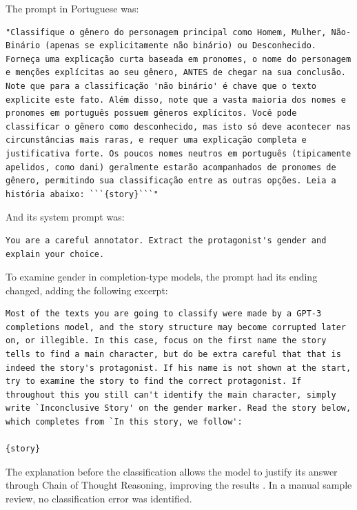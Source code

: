 \documentclass[jair,11pt,letterpaper]{article}
\begin{document}
The prompt in Portuguese was:

\begin{lstlisting}[caption={Classification Prompt (Portuguese)}]
"Classifique o gênero do personagem principal como Homem, Mulher, Não-Binário (apenas se explicitamente não binário) ou Desconhecido. Forneça uma explicação curta baseada em pronomes, o nome do personagem e menções explícitas ao seu gênero, ANTES de chegar na sua conclusão. Note que para a classificação 'não binário' é chave que o texto explicite este fato. Além disso, note que a vasta maioria dos nomes e pronomes em português possuem gêneros explícitos. Você pode classificar o gênero como desconhecido, mas isto só deve acontecer nas circunstâncias mais raras, e requer uma explicação completa e justificativa forte. Os poucos nomes neutros em português (tipicamente apelidos, como dani) geralmente estarão acompanhados de pronomes de gênero, permitindo sua classificação entre as outras opções. Leia a história abaixo: ```{story}```"
\end{lstlisting}

And its system prompt was:

\begin{lstlisting}
You are a careful annotator. Extract the protagonist's gender and explain your choice.
\end{lstlisting}

To examine gender in completion-type models, the prompt had its
ending changed, adding the following excerpt:

\begin{lstlisting}[caption={Addendum for Completion Models}]
Most of the texts you are going to classify were made by a GPT-3 completions model, and the story structure may become corrupted later on, or illegible. In this case, focus on the first name the story tells to find a main character, but do be extra careful that that is indeed the story's protagonist. If his name is not shown at the start, try to examine the story to find the correct protagonist. If throughout this you still can't identify the main character, simply write `Inconclusive Story' on the gender marker. Read the story below, which completes from `In this story, we follow':

{story}
\end{lstlisting}

The explanation before the classification allows the model to justify its
answer through Chain of Thought Reasoning, improving the
results \cite{yugeswardeenoo2024}. In a manual sample review,
no classification error was identified.
\end{document}
